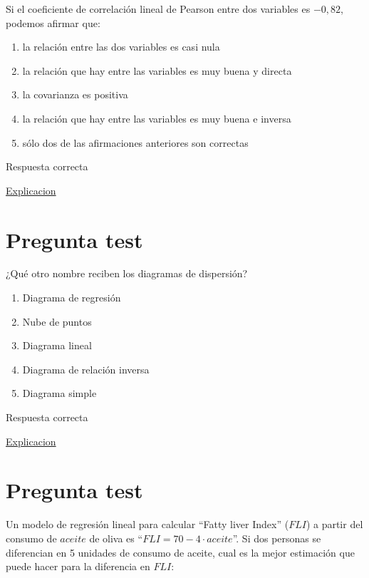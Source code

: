 \documentclass[
]{book}
\providecommand{\tightlist}{%
  \setlength{\itemsep}{0pt}\setlength{\parskip}{0pt}}
\begin{document}
Si el coeficiente de correlación lineal de Pearson entre dos variables es \(-0,82\), podemos afirmar que:

\begin{enumerate}
\def\labelenumi{\alph{enumi})}
\tightlist
\item
  la relación entre las dos variables es casi nula
\item
  la relación que hay entre las variables es muy buena y directa
\item
  la covarianza es positiva
\item
  la relación que hay entre las variables es muy buena e inversa
\item
  sólo dos de las afirmaciones anteriores son correctas
\end{enumerate}

Respuesta correcta

\href{https://1fjmanzano.github.io/bioestadistica/relaci\%C3\%B3n-entre-variables-nume\%CC\%81ricas.html\#coeficiente-de-correlacio\%CC\%81n}{Explicacion}

\hypertarget{pregunta-test-132}{%
\section{Pregunta test}\label{pregunta-test-132}}

¿Qué otro nombre reciben los diagramas de dispersión?

\begin{enumerate}
\def\labelenumi{\alph{enumi})}
\tightlist
\item
  Diagrama de regresión
\item
  Nube de puntos
\item
  Diagrama lineal
\item
  Diagrama de relación inversa
\item
  Diagrama simple
\end{enumerate}

Respuesta correcta

\href{https://1fjmanzano.github.io/bioestadistica/relaci\%C3\%B3n-entre-variables-nume\%CC\%81ricas.html\#diagramas-de-dispersio\%CC\%81n}{Explicacion}

\hypertarget{pregunta-test-133}{%
\section{Pregunta test}\label{pregunta-test-133}}

Un modelo de regresión lineal para calcular ``Fatty liver Index'' (\(FLI\)) a partir del consumo de \(aceite\) de oliva es ``\(FLI=70- 4 \cdot aceite\)''. Si dos personas se diferencian en 5 unidades de consumo de aceite, cual es la mejor estimación que puede hacer para la diferencia en \(FLI\):
\end{document}
